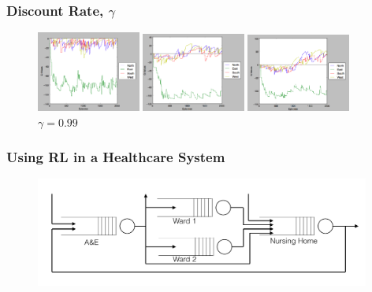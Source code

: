 \documentclass{beamer}
\begin{document}
  \begin{frame}
  	\frametitle{Discount Rate, $\gamma$}
	\begin{figure}
		\begin{minipage}{.32\textwidth}
			\includegraphics[width=3.4cm]{30a1g1}
				\caption{$\gamma = 0.1$}
		\end{minipage}
		\begin{minipage}{0.32\textwidth}
			\includegraphics[width=3.4cm]{30a1g9}
				\caption{$\gamma = 0.9$}
		\end{minipage}
		\begin{minipage}{0.32\textwidth}
			\includegraphics[width=3.4cm]{30a1g99}
				\caption{$\gamma = 0.99$}
		\end{minipage}
	\end{figure}
  \end{frame}
  
  \begin{frame}
  	\frametitle{Using RL in a Healthcare System}
	\begin{figure}
		\includegraphics[width=11cm]{QueueingNetwork}
	\end{figure}
  \end{frame}
  
\end{document}
